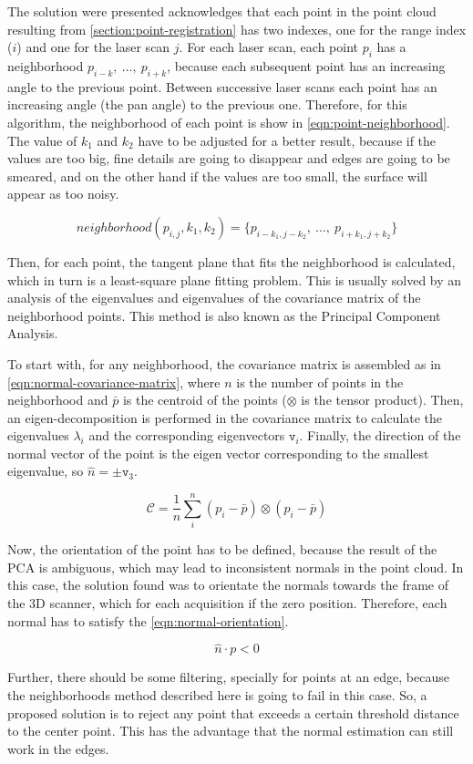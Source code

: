 The solution were presented acknowledges that each point in the point cloud resulting from \cref{section:point-registration} has two indexes, one for the range index ($i$) and one for the laser scan $j$. For each laser scan, each point $p_i$ has a neighborhood ${p_{i-k}, \ \dots, \ p_{i+k}}$, because each subsequent point has an increasing angle to the previous point. Between successive laser scans each point has an increasing angle (the pan angle) to the previous one. Therefore, for this algorithm, the neighborhood of each point is show in \cref{eqn:point-neighborhood}. The value of $k_1$ and $k_2$ have to be adjusted for a better result, because if the values are too big, fine details are going to disappear and edges are going to be smeared, and on the other hand if the values are too small, the surface will appear as too noisy.

\begin{equation}
\label{eqn:point-neighborhood}
    neighborhood(p_{i,j}, k_1, k_2) = \{p_{i-k_1, j-k_2}, \ \dots, \ p_{i+k_1, j+k_2}\}
\end{equation}

Then, for each point, the tangent plane that fits the neighborhood is calculated, which in turn is a least-square plane fitting problem. This is usually solved by an analysis of the eigenvalues and eigenvalues of the covariance matrix of the neighborhood points. This method is also known as the Principal Component Analysis.

To start with, for any neighborhood, the covariance matrix is assembled as in \cref{eqn:normal-covariance-matrix}, where $n$ is the number of points in the neighborhood and $\bar{p}$ is the centroid of the points ($\otimes$ is the  tensor product). Then, an eigen-decomposition is performed in the covariance matrix to calculate the eigenvalues $\lambda_i$ and the corresponding eigenvectors $\texttt{v}_i$. Finally, the direction of the normal vector of the point is the eigen vector corresponding to the smallest eigenvalue, so $\hat{n} = \pm \texttt{v}_3$.

\begin{equation}
\label{eqn:normal-covariance-matrix}
    \mathcal{C} = \frac{1}{n} \sum_{i}^{n}{(p_i - \bar{p}) \otimes (p_i - \bar{p})}
\end{equation}

Now, the orientation of the point has to be defined, because the result of the PCA is ambiguous, which may lead to inconsistent normals in the point cloud. In this case, the solution found was to orientate the normals towards the frame of the 3D scanner, which for each acquisition if the zero position.     Therefore, each normal has to satisfy the \cref{eqn:normal-orientation}.

\begin{equation}
\label{eqn:normal-orientation}
    \hat{n} \cdot p < 0
\end{equation}

Further, there should be some filtering, specially for points at an edge, because the neighborhoods method described here is going to fail in this case. So, a proposed solution is to reject any point that exceeds a certain threshold distance to the center point. This has the advantage that the normal estimation can still work in the edges.